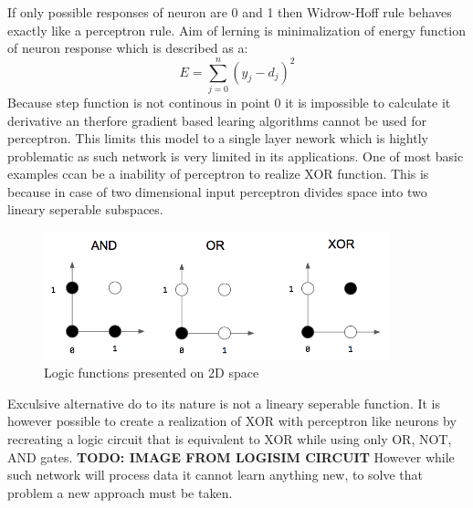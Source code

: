 If only possible responses of neuron are 0 and 1 then Widrow-Hoff rule behaves exactly like a
perceptron rule.
Aim of lerning is minimalization of energy function of neuron response which is described as a:
\begin{equation}
	E = \sum_{j=0}^{n}(y_{j}-d_{j})^{2}
\end{equation}
Because step function is not continous in point 0 it is impossible to calculate it derivative
an therfore gradient based learing algorithms cannot be used for perceptron.
This limits this model to a single layer nework which is hightly problematic as such network
is very limited in its applications.
One of most basic examples ccan be a inability of perceptron to realize XOR function.
This is because in case of two dimensional input perceptron divides space into two lineary
seperable subspaces.
\begin{figure}[h] 
	\centering
	\includegraphics[width=10cm]{res/logic_neuron}
	\caption{Logic functions presented on 2D space}
	\label{fig:logic_neuron}
\end{figure}
Exculsive alternative do to its nature is not a lineary seperable function. It is however
possible to create a realization of XOR with perceptron like neurons by recreating a logic
circuit that is equivalent to XOR while using only OR, NOT, AND gates.
\textbf{TODO: IMAGE FROM LOGISIM CIRCUIT}
However while such network will process data it cannot learn anything new, to solve that 
problem a new approach must be taken.

